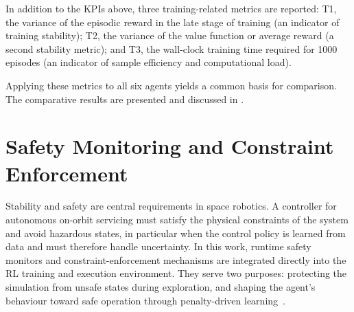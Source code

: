 \documentclass{ieeeaccess}
\begin{document}
In addition to the KPIs above, three training-related metrics are reported: T1, the variance of the episodic reward in the late stage of training (an indicator of training stability); T2, the variance of the value function or average reward (a second stability metric); and T3, the wall-clock training time required for 1000 episodes (an indicator of sample efficiency and computational load).

Applying these metrics to all six agents yields a common basis for comparison. The comparative results are presented and discussed in .

\section{Safety Monitoring and Constraint Enforcement}\label{formal}
Stability and safety are central requirements in space robotics. A controller for autonomous on-orbit servicing must satisfy the physical constraints of the system and avoid hazardous states, in particular when the control policy is learned from data and must therefore handle uncertainty. In this work, runtime safety monitors and constraint-enforcement mechanisms are integrated directly into the RL training and execution environment. They serve two purposes: protecting the simulation from unsafe states during exploration, and shaping the agent's behaviour toward safe operation through penalty-driven learning~\cite{b7,b22}.
\end{document}
